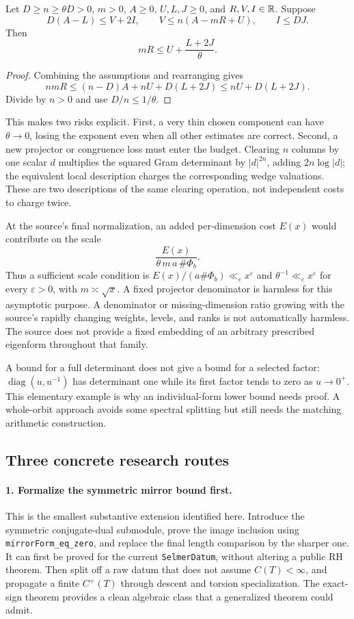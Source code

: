 \begin{lemma}
Let $D\ge n\ge\theta D>0$, $m>0$, $A\ge0$, $U,L,J\ge0$, and $R,V,I\in\mathbb R$.
Suppose
\[
 D(A-L)\le V+2I,\qquad V\le n(A-mR+U),\qquad I\le DJ.
\]
Then
\[
 mR\le U+\frac{L+2J}{\theta}.
\]
\end{lemma}
\begin{proof}
Combining the assumptions and rearranging gives
\[
 nmR\le(n-D)A+nU+D(L+2J)\le nU+D(L+2J).
\]
Divide by $n>0$ and use $D/n\le1/\theta$.
\end{proof}

This makes two risks explicit. First, a very thin chosen component can
have $\theta\to0$, losing the exponent even when all other estimates are
correct. Second, a new projector or congruence loss must enter the budget.
Clearing $n$ columns by one scalar $d$ multiplies the squared Gram
determinant by $|d|^{2n}$, adding $2n\log|d|$; the equivalent local
description charges the corresponding wedge valuations. These are two
descriptions of the same clearing operation, not independent costs to
charge twice.

At the source's final normalization, an added per-dimension cost $E(x)$
would contribute on the scale
\[
 \frac{E(x)}{\theta\,m\,a\,\#\Phi_b}.
\]
Thus a sufficient scale condition is
$E(x)/(a\#\Phi_b)\ll_\varepsilon x^\varepsilon$ and
$\theta^{-1}\ll_\varepsilon x^\varepsilon$ for every $\varepsilon>0$,
with $m\asymp\sqrt{x}$. A fixed projector denominator is harmless for
this asymptotic purpose. A denominator or missing-dimension ratio growing
with the source's rapidly changing weights, levels, and ranks is not
automatically harmless. The source does not provide a fixed embedding of
an arbitrary prescribed eigenform throughout that family.

A bound for a full determinant does not give a bound for a selected
factor: $\operatorname{diag}(u,u^{-1})$ has determinant one while its first
factor tends to zero as $u\to0^+$. This elementary example is why an
individual-form lower bound needs proof. A whole-orbit approach avoids
some spectral splitting but still needs the matching arithmetic
construction.

\subsection{Three concrete research routes}

\paragraph{1. Formalize the symmetric mirror bound first.}
This is the smallest substantive extension identified here. Introduce the
symmetric conjugate-dual submodule, prove the image inclusion using
\texttt{mirrorForm\_eq\_zero}, and replace the final length comparison
by the sharper one. It can first be proved for the current
\texttt{SelmerDatum}, without altering a public RH theorem. Then split
off a raw datum that does not assume $C(T)<\infty$, and propagate a finite
$C^+(T)$ through descent and torsion specialization. The exact-sign theorem
provides a clean algebraic class that a generalized theorem could admit.

